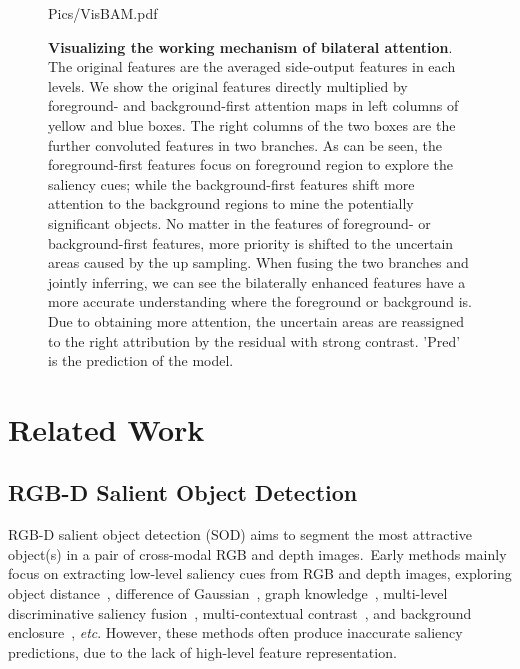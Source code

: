 \documentclass[journal]{IEEEtran}
\def\etc{\emph{etc}}
\begin{document}
\begin{figure*}[t]
	\centering
	\begin{overpic}[width=.96\textwidth]{Pics/VisBAM.pdf}
	\end{overpic}
	\caption{\textbf{Visualizing the working mechanism of bilateral attention}.
		The original features are the averaged side-output features in each levels.
We show the original features directly multiplied by foreground- and background-first attention maps in left columns of yellow and blue boxes.
		The right columns of the two boxes are the further convoluted features in two branches.
		As can be seen, 
		the foreground-first features focus on foreground region to explore the saliency cues;
		while the background-first features shift more attention to the background regions to mine the potentially significant objects.
		No matter in the features of foreground- or background-first features, 
		more priority is shifted to the uncertain areas caused by the up sampling.
		When fusing the two branches and jointly inferring,
		we can see the bilaterally enhanced features have a more accurate understanding
		where the foreground or background is.
		Due to obtaining more attention, 
		the uncertain areas are reassigned to the right attribution by the residual with strong contrast.
		'Pred' is the prediction of the model.
	}
\label{fig:VisBAM}
\end{figure*}

\section{Related Work}
\label{sec:related}


\subsection{RGB-D Salient Object Detection}
RGB-D salient object detection (SOD) aims to segment the most attractive object(s) in a pair of cross-modal RGB and depth images.\
Early methods mainly focus on extracting low-level saliency cues from RGB and depth images, exploring object distance~\cite{liang2012depth}, difference of Gaussian~\cite{ju2014depth}, graph knowledge~\cite{cong2016saliency}, multi-level discriminative saliency fusion~\cite{song2017depth}, multi-contextual contrast~\cite{cong2019going,peng2014rgbd}, and background enclosure~\cite{feng2016local}, \etc.
However, these methods often produce inaccurate saliency predictions, due to the lack of high-level feature representation.
\end{document}
